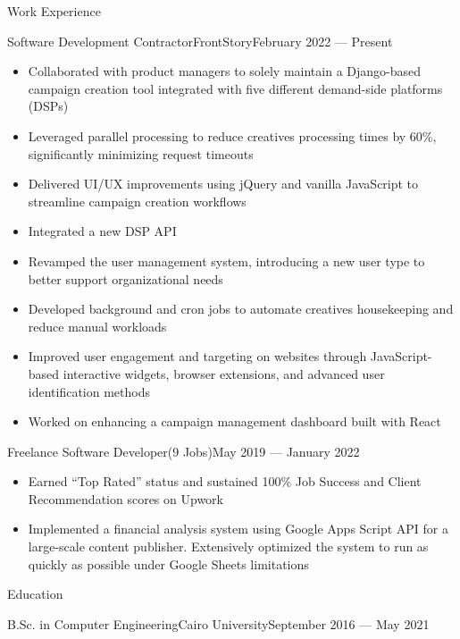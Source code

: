 \documentclass[]{mcdowellcv}
\begin{document}
	\makeheader
	
	
	\begin{cvsection}{Work Experience}
		\begin{cvsubsection}{Software Development Contractor}{FrontStory}{February 2022 — Present}
			\begin{itemize}
				\item Collaborated with product managers to solely maintain a Django-based campaign creation tool integrated with five different demand-side platforms (DSPs)
				\item Leveraged parallel processing to reduce creatives processing times by 60\%, significantly minimizing request timeouts
				\item Delivered UI/UX improvements using jQuery and vanilla JavaScript to streamline campaign creation workflows
				\item Integrated a new DSP API
				\item Revamped the user management system, introducing a new user type to better support organizational needs
				\item Developed background and cron jobs to automate creatives housekeeping and reduce manual workloads
				\item Improved user engagement and targeting on websites through JavaScript-based interactive widgets, browser extensions, and advanced user identification methods
				\item Worked on enhancing a campaign management dashboard built with React
			\end{itemize}
		\end{cvsubsection}
		\begin{cvsubsection}{Freelance Software Developer}{(9 Jobs)}{May 2019 — January 2022}
			\begin{itemize}
				\item Earned “Top Rated” status and sustained 100\% Job Success and Client Recommendation scores on Upwork
				\item Implemented a financial analysis system using Google Apps Script API for a large-scale content publisher. Extensively optimized the system to run as quickly as possible under Google Sheets limitations
			\end{itemize}
		\end{cvsubsection}
	\end{cvsection}
	
	\begin{cvsection}{Education}
		\begin{cvsubsection}{B.Sc. in Computer Engineering}{Cairo University}{September 2016 — May 2021}\end{cvsubsection}
	\end{cvsection}
	\vspace*{-12pt}
	
\end{document}
